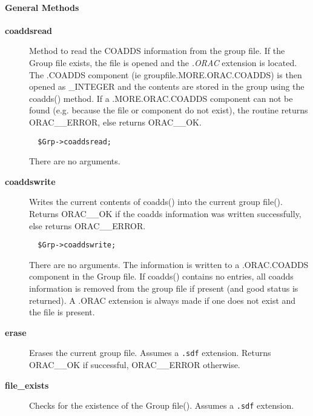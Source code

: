 \paragraph*{General Methods\label{ORAC::Group::NDF_General_Methods}}
\begin{description}

\item[{\textbf{coaddsread}}] \mbox{}

Method to read the COADDS information from the group file. If the
Group file exists, the file is opened and the \emph{.ORAC} extension is
located. The .COADDS component (ie groupfile.MORE.ORAC.COADDS) is then
opened as \_INTEGER and the contents are stored in the group using the
coadds() method. If a .MORE.ORAC.COADDS component can not be found (e.g.
because the file or component do not exist), the routine returns
ORAC\_\_ERROR, else returns ORAC\_\_OK.

\begin{verbatim}
  $Grp->coaddsread;
\end{verbatim}


There are no arguments.


\item[{\textbf{coaddswrite}}] \mbox{}

Writes the current contents of coadds() into the current group file().
Returns ORAC\_\_OK if the coadds information was written successfully,
else returns ORAC\_\_ERROR.

\begin{verbatim}
  $Grp->coaddswrite;
\end{verbatim}


There are no arguments. The information is written to a .ORAC.COADDS
component in the Group file.  If coadds() contains no entries, all
coadds information is removed from the group file if present (and good
status is returned). A .ORAC extension is always made if one does not
exist and the file is present.


\item[{\textbf{erase}}] \mbox{}

Erases the current group file. Assumes a \texttt{.sdf} extension.
Returns ORAC\_\_OK if successful, ORAC\_\_ERROR otherwise.


\item[{\textbf{file\_exists}}] \mbox{}

Checks for the existence of the Group file(). Assumes a \texttt{.sdf}
extension.

\end{description}
